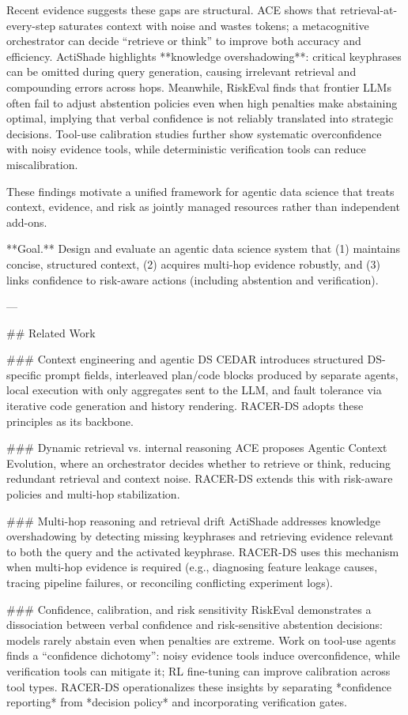 Recent evidence suggests these gaps are structural. ACE shows that retrieval-at-every-step saturates context with noise and wastes tokens; a metacognitive orchestrator can decide “retrieve or think” to improve both accuracy and efficiency. ActiShade highlights **knowledge overshadowing**: critical keyphrases can be omitted during query generation, causing irrelevant retrieval and compounding errors across hops. Meanwhile, RiskEval finds that frontier LLMs often fail to adjust abstention policies even when high penalties make abstaining optimal, implying that verbal confidence is not reliably translated into strategic decisions. Tool-use calibration studies further show systematic overconfidence with noisy evidence tools, while deterministic verification tools can reduce miscalibration.

These findings motivate a unified framework for agentic data science that treats context, evidence, and risk as jointly managed resources rather than independent add-ons.

**Goal.** Design and evaluate an agentic data science system that (1) maintains concise, structured context, (2) acquires multi-hop evidence robustly, and (3) links confidence to risk-aware actions (including abstention and verification).

---

## Related Work  

### Context engineering and agentic DS  
CEDAR introduces structured DS-specific prompt fields, interleaved plan/code blocks produced by separate agents, local execution with only aggregates sent to the LLM, and fault tolerance via iterative code generation and history rendering. RACER-DS adopts these principles as its backbone.

### Dynamic retrieval vs. internal reasoning  
ACE proposes Agentic Context Evolution, where an orchestrator decides whether to retrieve or think, reducing redundant retrieval and context noise. RACER-DS extends this with risk-aware policies and multi-hop stabilization.

### Multi-hop reasoning and retrieval drift  
ActiShade addresses knowledge overshadowing by detecting missing keyphrases and retrieving evidence relevant to both the query and the activated keyphrase. RACER-DS uses this mechanism when multi-hop evidence is required (e.g., diagnosing feature leakage causes, tracing pipeline failures, or reconciling conflicting experiment logs).

### Confidence, calibration, and risk sensitivity  
RiskEval demonstrates a dissociation between verbal confidence and risk-sensitive abstention decisions: models rarely abstain even when penalties are extreme. Work on tool-use agents finds a “confidence dichotomy”: noisy evidence tools induce overconfidence, while verification tools can mitigate it; RL fine-tuning can improve calibration across tool types. RACER-DS operationalizes these insights by separating *confidence reporting* from *decision policy* and incorporating verification gates.

